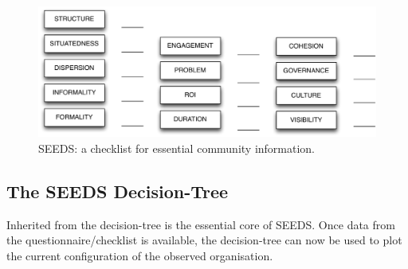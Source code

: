 \begin{figure}[h!]
    \includegraphics[width=5.3in]{checklist.pdf}    %
\caption{\footnotesize SEEDS: a checklist for essential community information.}\label{checklist}
\end{figure}
\subsection{The SEEDS Decision-Tree}\label{dectree}

Inherited from \cite{specissue} the decision-tree is the essential core of SEEDS. Once data from the questionnaire/checklist is available, the decision-tree can now be used to plot the current configuration of the observed organisation.

